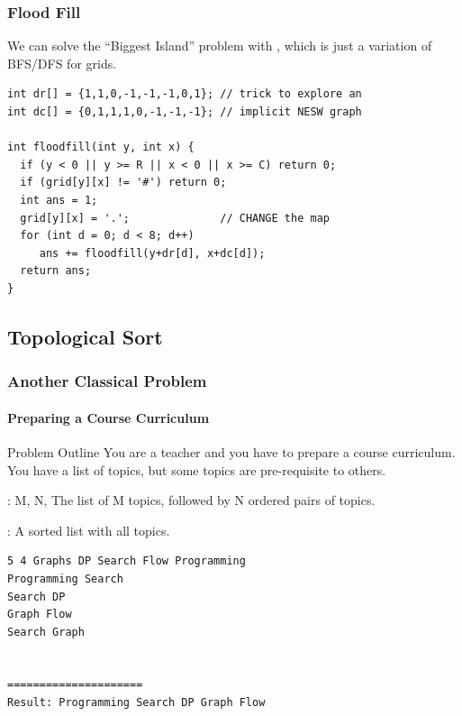 \begin{frame}[fragile]
  \frametitle{Flood Fill}
  {\smaller
      We can solve the ``Biggest Island'' problem with
      , which is just a variation of
      BFS/DFS for grids.

  \begin{exampleblock}{}
\begin{verbatim}
int dr[] = {1,1,0,-1,-1,-1,0,1}; // trick to explore an
int dc[] = {0,1,1,1,0,-1,-1,-1}; // implicit NESW graph

int floodfill(int y, int x) {
  if (y < 0 || y >= R || x < 0 || x >= C) return 0;
  if (grid[y][x] != '#') return 0;
  int ans = 1;
  grid[y][x] = '.';              // CHANGE the map
  for (int d = 0; d < 8; d++)
     ans += floodfill(y+dr[d], x+dc[d]);
  return ans;
}
\end{verbatim}
  \end{exampleblock}
  }
\end{frame}

\subsection{Topological Sort}

\begin{frame}[fragile]
  \frametitle{Another Classical Problem}
  \framesubtitle{Preparing a Course Curriculum}
  {\smaller
  \begin{block}{Problem Outline}
    You are a teacher and you have to prepare a course curriculum.
    You have a list of topics, but some topics are pre-requisite to others.

    \bigskip

    : M, N, The list of M topics, followed by N ordered pairs of topics.

    : A sorted list with all topics.

  \end{block}
\begin{verbatim}
5 4 Graphs DP Search Flow Programming
Programming Search
Search DP
Graph Flow
Search Graph


=====================
Result: Programming Search DP Graph Flow
\end{verbatim}

  }
\end{frame}

